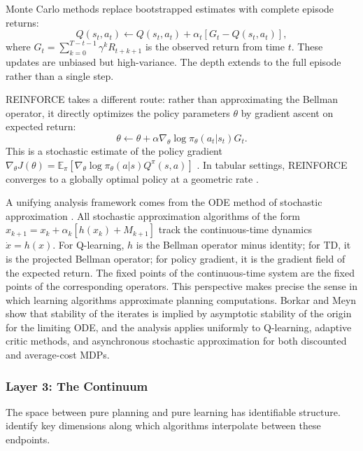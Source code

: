 Monte Carlo methods replace bootstrapped estimates with complete episode returns:
\begin{equation}
Q(s_t,a_t) \leftarrow Q(s_t,a_t) + \alpha_t \left[ G_t - Q(s_t,a_t) \right],
\end{equation}
where $G_t = \sum_{k=0}^{T-t-1} \gamma^k R_{t+k+1}$ is the observed return from time $t$. These updates are unbiased but high-variance. The depth extends to the full episode rather than a single step.

REINFORCE \citep{williams1992_reinforce} takes a different route: rather than approximating the Bellman operator, it directly optimizes the policy parameters $\theta$ by gradient ascent on expected return:
\begin{equation}
\theta \leftarrow \theta + \alpha \nabla_\theta \log \pi_\theta(a_t|s_t) G_t.
\end{equation}
This is a stochastic estimate of the policy gradient $\nabla_\theta J(\theta) = \mathbb{E}_\pi [\nabla_\theta \log \pi_\theta(a|s) Q^\pi(s,a)]$ \citep{SuttonMcAllester2000}. In tabular settings, REINFORCE converges to a globally optimal policy at a geometric rate \citep{agarwal2021theory}.

A unifying analysis framework comes from the ODE method of stochastic approximation \citep{borkar2000}. All stochastic approximation algorithms of the form $x_{k+1} = x_k + \alpha_k [h(x_k) + M_{k+1}]$ track the continuous-time dynamics $\dot{x} = h(x)$. For Q-learning, $h$ is the Bellman operator minus identity; for TD, it is the projected Bellman operator; for policy gradient, it is the gradient field of the expected return. The fixed points of the continuous-time system are the fixed points of the corresponding operators. This perspective makes precise the sense in which learning algorithms approximate planning computations. Borkar and Meyn show that stability of the iterates is implied by asymptotic stability of the origin for the limiting ODE, and the analysis applies uniformly to Q-learning, adaptive critic methods, and asynchronous stochastic approximation for both discounted and average-cost MDPs.

\subsubsection{Layer 3: The Continuum}

The space between pure planning and pure learning has identifiable structure. \citet{moerland2022unifying} identify key dimensions along which algorithms interpolate between these endpoints.

